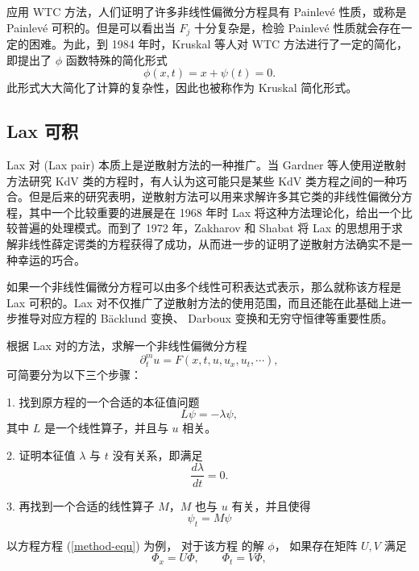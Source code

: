 应用 WTC 方法，人们证明了许多非线性偏微分方程具有 Painlev\'{e} 性质，或称是  Painlev\'{e} 可积的。但是可以看出当 $F_j$ 十分复杂是，检验 Painlev\'{e} 性质就会存在一定的困难。为此，到 1984 年时，Kruskal 等人对 WTC 方法进行了一定的简化，即提出了 $\phi$ 函数特殊的简化形式
\begin{equation}
  \phi(x,t) = x + \psi(t) = 0.
\end{equation}
此形式大大简化了计算的复杂性，因此也被称作为 Kruskal 简化形式。

\subsection{Lax 可积}
Lax 对 (Lax pair) 本质上是逆散射方法的一种推广。当 Gardner 等人使用逆散射方法研究 KdV 类的方程时，有人认为这可能只是某些 KdV 类方程之间的一种巧合。但是后来的研究表明，逆散射方法可以用来求解许多其它类的非线性偏微分方程，其中一个比较重要的进展是在 1968 年时 Lax 将这种方法理论化，给出一个比较普遍的处理模式。而到了 1972 年，Zakharov 和 Shabat 将 Lax 的思想用于求解非线性薛定谔类的方程获得了成功，从而进一步的证明了逆散射方法确实不是一种幸运的巧合。

如果一个非线性偏微分方程可以由多个线性可积表达式表示，那么就称该方程是 Lax 可积的。Lax 对不仅推广了逆散射方法的使用范围，而且还能在此基础上进一步推导对应方程的 B\"{a}cklund 变换、 Darboux 变换和无穷守恒律等重要性质。


根据 Lax 对的方法，求解一个非线性偏微分方程
\begin{equation}
  \partial^m_t u = F(x, t, u, u_x, u_t, \cdots),
\end{equation}
可简要分为以下三个步骤：

1. 找到原方程的一个合适的本征值问题
\begin{equation}
  L\psi = -\lambda \psi,
\end{equation}
其中 $L$ 是一个线性算子，并且与 $u$ 相关。

2. 证明本征值 $\lambda$ 与 $t$ 没有关系，即满足
\begin{equation}
  \frac{d\lambda}{dt} = 0.
\end{equation}

3. 再找到一个合适的线性算子 $M$，$M$ 也与 $u$ 有关，并且使得
\begin{equation}
  \psi_t = M\psi
\end{equation}

以方程方程 (\ref{method-equ}) 为例， 对于该方程 的解 $\phi$， 如果存在矩阵 $U, V$ 满足
\begin{equation}
  \Phi_x=U \Phi, \qquad \Phi_t=V \Phi, \label{method-Lax}
\end{equation}

